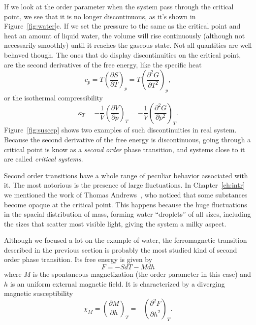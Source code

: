 If we look at the order parameter when the system pass through the critical
point, we see that it is no longer discontinuous, as it's shown in
Figure~\ref{fig:water}c. If we set the pressure to the same as the critical
point and heat an amount of liquid water, the volume will rise continuously
(although not necessarily smoothly) until it reaches the gaseous state. Not all
quantities are well behaved though. The ones that do display discontinuities on
the critical point, are the second derivatives of the free energy, like the
specific heat
\begin{equation}
    c_p=T{\left(\frac{\partial S}{\partial T}\right)}_{p}=
    T{\left(\frac{\partial^{2}G}{\partial T^{2}}\right)}_{p},
\end{equation}
or the isothermal compressibility
\begin{equation}
    \kappa_T=-\frac{1}{V}{\left(\frac{\partial V}{\partial p}\right)}_{T}=
    -\frac{1}{V}{\left(\frac{\partial^{2}G}{\partial p^{2}}\right)}_{T}.
\end{equation}
Figure~\ref{fig:suscep} shows two examples of such discontinuities in real
system. Because the second derivative of the free energy is discontinuous,
going through a critical point is know as a \textit{second order} phase
transition, and systems close to it are called \textit{critical systems}.

Second order transitions have a whole range of peculiar behavior associated
with it. The most notorious is the presence of large fluctuations. In
Chapter~\ref{ch:intr} we mentioned the work of Thomas
Andrews~\cite{Andrews1869}, who noticed that some substances become opaque at
the critical point. This happens because the huge fluctuations in the spacial
distribution of mass, forming water ``droplets'' of all sizes, including the
sizes that scatter most visible light, giving the system a milky aspect.

Although we focused a lot on the example of water, the ferromagnetic transition
described in the previous section is probably the most studied kind of second
order phase transition. Its free energy is given by
\begin{equation}
    F = -SdT-Mdh
\end{equation}
where $M$ is the spontaneous magnetization (the order parameter in this case)
and $h$ is an uniform external magnetic field. It is characterized by a
diverging magnetic susceptibility
\begin{equation}
    \chi_{M}=
    {\left(\frac{\partial M}{\partial h}\right)}_{T}=
    -{\left(\frac{\partial^{2}F}{\partial h^{2}}\right)}_{T}.
\end{equation}

